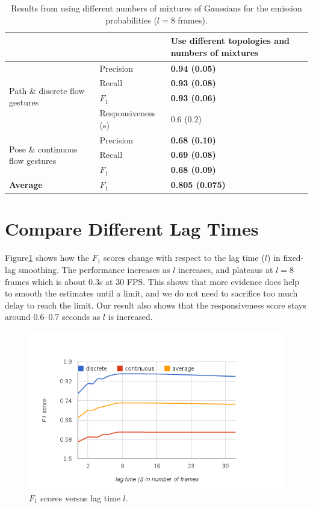 \begin{table}[tbh]
\centering
\begin{tabular}{|p{4.5cm}|l|p{4cm}|}
\hline
& & \textbf{Use different topologies and numbers of mixtures} \\
\hline
\multirow{4}{4cm}{Path \& discrete flow gestures} 
& Precision & \textbf{0.94 (0.05)} \\
\cline{2-3}
& Recall    & \textbf{0.93 (0.08)} \\
\cline{2-3}
& $F_1$ & \textbf{0.93 (0.06)} \\
\cline{2-3}
& Responsiveness (s) & 0.6 (0.2)  \\
\hline
\multirow{3}{4cm}{Pose \& continuous flow gestures}
& Precision & \textbf{0.68 (0.10)} \\
\cline{2-3}
& Recall & \textbf{0.69 (0.08)} \\
\cline{2-3}
& $F_1$ & \textbf{0.68 (0.09)}  \\
\hline
\textbf{Average} & $F_1$ & \textbf{0.805 (0.075)}\\
\hline
\end{tabular}
\caption{Results from using different numbers of mixtures of Gaussians
for the emission probabilities ($l = 8$ frames).}
\label{tab:different-mixtures}
\end{table}


\section{Compare Different Lag Times}
Figure\ref{fig:lag} shows how the $F_1$ scores change with respect to the lag
time ($l$) in fixed-lag smoothing. The performance increases as $l$ increases, and
plateaus at $l=8$ frames which is about 0.3s at 30 FPS. This shows that more
evidence does help to smooth the estimates until a limit, and we do not need to
sacrifice too much delay to reach the limit. Our result also shows that the
responsiveness score stays around 0.6--0.7 seconds as $l$ is increased.

\begin{figure}[!tbh]
\centering
\includegraphics[trim=0 5mm 0 15mm, clip,
width=\columnwidth]{figures/f1_lag.png}
\caption{$F_1$ scores versus lag time $l$.}
\label{fig:lag}
\end{figure}

